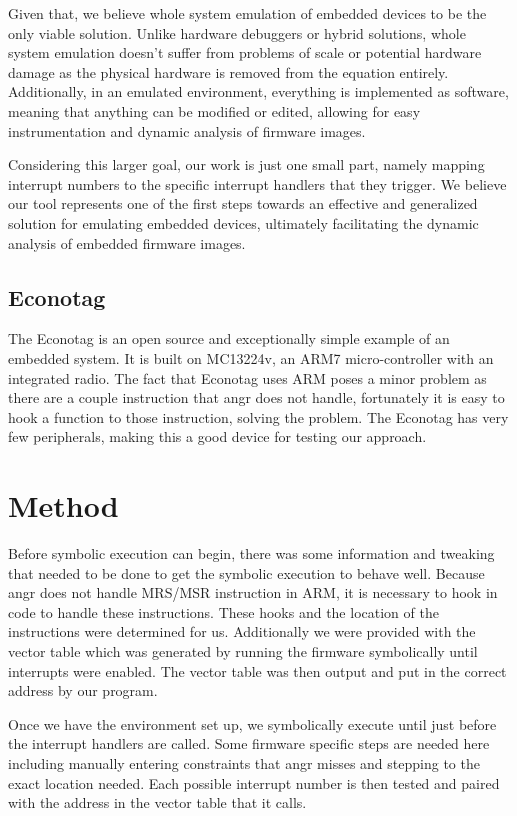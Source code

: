 \documentclass[letterpaper, 10 pt, conference]{ieeeconf}
\begin{document}
Given that, we believe whole system emulation of embedded devices to be the only viable solution. Unlike hardware debuggers or hybrid solutions, whole system emulation doesn't suffer from problems of scale or potential hardware damage as the physical hardware is removed from the equation entirely. Additionally, in an emulated environment, everything is implemented as software, meaning that anything can be modified or edited, allowing for easy instrumentation and dynamic analysis of firmware images.

Considering this larger goal, our work is just one small part, namely mapping interrupt numbers to the specific interrupt handlers that they trigger. We believe our tool represents one of the first steps towards an effective and generalized solution for emulating embedded devices, ultimately facilitating the dynamic analysis of embedded firmware images.

\subsection{Econotag} %
The Econotag is an open source and exceptionally simple example of an embedded system. It is built on MC13224v, an ARM7 micro-controller with an integrated radio. The fact that Econotag uses ARM poses a minor problem as there are a couple instruction that angr does not handle, fortunately it is easy to hook a function to those instruction, solving the problem. The Econotag has very few peripherals, making this a good device for testing our approach.

\section{Method}
Before symbolic execution can begin, there was some information and tweaking that needed to be done to get the symbolic execution to behave well. Because angr does not handle MRS/MSR instruction in ARM, it is necessary to hook in code to handle these instructions. These hooks and the location of the instructions were determined for us. Additionally we were provided with the vector table which was generated by running the firmware symbolically until interrupts were enabled. %
The vector table was then output and put in the correct address by our program. 

Once we have the environment set up, we symbolically execute until just before the interrupt handlers are called. Some firmware specific steps are needed here including manually entering constraints that angr misses and stepping to the exact location needed. Each possible interrupt number is then tested and paired with the address in the vector table that it calls.
\end{document}

